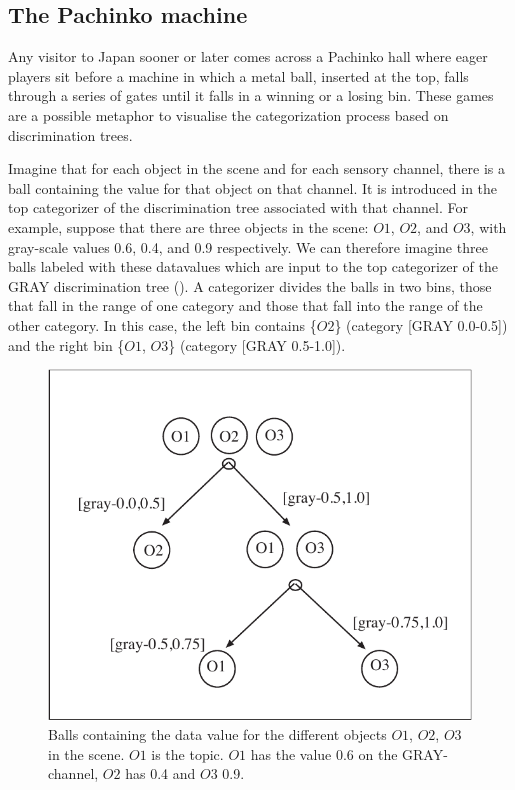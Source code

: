 \subsection{The Pachinko machine}

Any visitor to Japan sooner or later comes across a 
Pachinko hall where eager players sit before a 
machine in which a metal ball, inserted at the top, 
falls through a series of gates until it falls in 
a winning or a losing bin. These games are
a possible metaphor to visualise the categorization process
based on discrimination trees. 

Imagine that for each object in
the scene and for each sensory channel, there is a ball
containing the value for that object on that channel. It
is introduced in the top categorizer of the 
discrimination tree associated with that channel. 
For example, suppose that there are three
objects in the scene: $O1$, $O2$, and $O3$, 
with gray-scale values 0.6, 0.4, and 0.9 respectively. 
We can therefore imagine three balls labeled with these datavalues
which are input to the top categorizer of the 
GRAY discrimination tree (). 
A categorizer divides the balls in two bins, 
those that fall in the range of 
one category and those that fall into the range of the other
category. In this case, the left bin contains \{$O2$\} 
(category [GRAY 0.0-0.5]) 
and the right bin \{$O1$, $O3$\} (category [GRAY 0.5-1.0]). 

\begin{figure}[htbp]
  \centerline{\includegraphics[width=.65\textwidth]{chap4/figs/balls}}
\caption{\footnotesize \label{balls} Balls containing
the data value for the different objects
$O1$, $O2$, $O3$ in the scene. $O1$ is the topic.
$O1$ has the value 0.6 on the GRAY-channel, $O2$ has
0.4 and $O3$ 0.9.} 
\end{figure}

